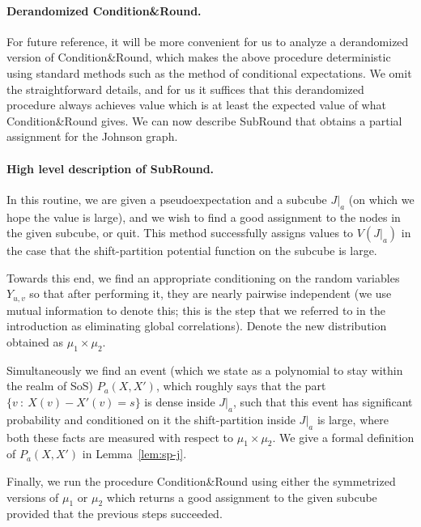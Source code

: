 \documentclass[11pt]{article}
\newcommand\skipi{{\vskip 10pt}}
\def \sos {SoS\xspace}
\theoremstyle{definition}
\begin{document}
\paragraph{Derandomized Condition\&Round.}
For future reference, it will be more convenient for us to analyze
a derandomized version of Condition\&Round, which makes the 
above procedure deterministic using standard methods such as 
the method of conditional expectations. We omit the straightforward details, and for us it suffices that this derandomized 
procedure always achieves value which is at least the 
expected value of what Condition\&Round gives.
\skipi
We can now describe SubRound that obtains a partial assignment for the Johnson graph. 

\paragraph{High level description of SubRound.}
In this routine, we are given a pseudoexpectation and a 
subcube $J|_a$ (on which we hope the value is large), and we wish to 
find a good assignment to the nodes in the given subcube, 
or quit. This method successfully assigns values to $V(J|_a)$ 
in the case that the shift-partition potential function on the subcube is large.

Towards this end, we find an appropriate conditioning on the random variables $Y_{u,v}$ so that after performing it, 
they are nearly pairwise independent (we use mutual information 
to denote this; this is the step that we referred to in 
the introduction as eliminating global correlations). Denote the new distribution obtained as $\mu_1 \times \mu_2$.

Simultaneously we find an event 
(which we state 
as a polynomial to stay within the realm of \sos) $P_a(X,X')$, which roughly says that 
the part $\{v~:~X(v)-X'(v) = s\}$ is dense inside $J|_a$, 
such that this event has significant probability 
and conditioned on it the shift-partition inside $J|_a$
is large, where both these facts are measured with respect to $\mu_1 \times \mu_2$. We give a formal definition of $P_a(X,X')$ in Lemma~\ref{lem:sp-j}.

Finally, we run the procedure Condition\&Round using either the symmetrized versions of $\mu_1$ or $\mu_2$ which 
returns a good assignment to the given subcube provided that the previous steps succeeded.
\end{document}
